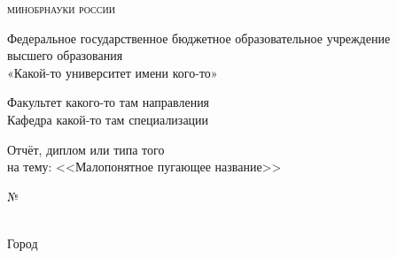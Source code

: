 \begin{center}
  \large
  \textsc{минобрнауки россии}\\


  Федеральное государственное бюджетное образовательное учреждение\\
  высшего образования\\
  «Какой-то университет имени кого-то»\\


  Факультет какого-то там направления\\
  Кафедра какой-то там специализации\\


  \huge Отчёт, диплом или типа того \\

  \large на тему:  <<Малопонятное пугающее название>>\\
\end{center}


\begin{flushright}
\end{flushright}

\begin{flushleft}
  \parbox{2.5cm}{
    № \hrulefill\\
    \phantom{} \hrulefill\\
  }
\end{flushleft}


\begin{center}
\large{Город \the\year}
\end{center}

\thispagestyle{empty}
